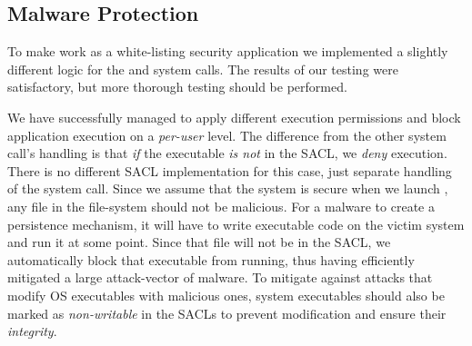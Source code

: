 %
%
%

\subsection{Malware Protection}

\par To make  work as a white-listing security application we implemented a slightly different logic for the  and  system calls. The results of our testing were satisfactory, but more thorough testing should be performed. 

\par We have successfully managed to apply different execution permissions and block application execution on a \emph{per-user} level. The difference from the other system call's handling is that \emph{if} the executable \emph{is not} in the \ac{SACL}, we \emph{deny} execution. There is no different \ac{SACL} implementation for this case, just separate handling of the  system call. Since we assume that the system is secure when we launch , any file in the file-system should not be malicious. For a malware to create a persistence mechanism, it will have to write executable code on the victim system and run it at some point. Since that file will not be in the \ac{SACL}, we automatically block that executable from running, thus having efficiently mitigated a large attack-vector of malware. To mitigate against attacks that modify \ac{OS} executables with malicious ones, system executables should also be marked as \emph{non-writable} in the \acp{SACL} to prevent modification and ensure their \emph{integrity}.

